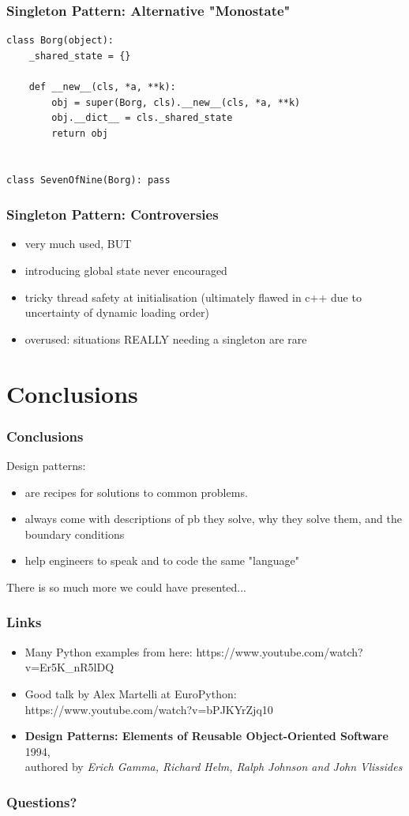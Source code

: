 \documentclass{beamer}
\begin{document}
\begin{frame}[fragile]
\frametitle{Singleton Pattern: Alternative "Monostate"}
\begin{verbatim}
class Borg(object):
    _shared_state = {}

    def __new__(cls, *a, **k):
        obj = super(Borg, cls).__new__(cls, *a, **k)
        obj.__dict__ = cls._shared_state
        return obj


class SevenOfNine(Borg): pass
\end{verbatim}
\end{frame}

\begin{frame}
\frametitle{Singleton Pattern: Controversies}
\begin{itemize}
 \item very much used, BUT
 \item introducing global state never encouraged
 \item tricky thread safety at initialisation (ultimately flawed in c++ due to uncertainty of dynamic loading order)
 \item overused: situations REALLY needing a singleton are rare
\end{itemize}
\end{frame} 

\section{Conclusions}
\begin{frame}
\frametitle{Conclusions}
Design patterns:
\begin{itemize}
  \item are recipes for solutions to common problems. 
  \item always come with descriptions of pb they solve, why they solve them, and the boundary conditions
  \item help engineers to speak and to code the same "language"
\end{itemize}

There is so much more we could have presented...
\end{frame}

\begin{frame}
\frametitle{Links}

  \begin{itemize}
   \item Many Python examples from here: https://www.youtube.com/watch?v=Er5K\_nR5lDQ
   \item Good talk by Alex Martelli at EuroPython: https://www.youtube.com/watch?v=bPJKYrZjq10
   \item \textbf{Design Patterns: Elements of Reusable Object-Oriented Software} 1994, \\
authored by \emph{Erich Gamma, Richard Helm, Ralph Johnson and John Vlissides}
  \end{itemize}

\end{frame}

 \begin{frame}
 \frametitle{Questions?}
 \begin{center}
 \end{center}
 \end{frame}
\end{document}
